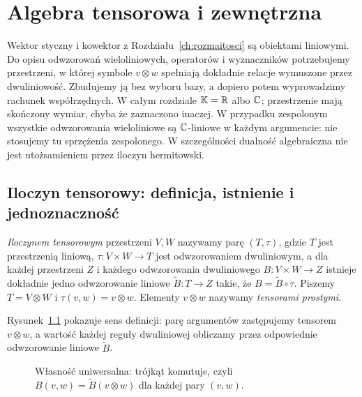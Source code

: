\chapter{Algebra tensorowa i zewnętrzna}
\label{ch:algebra-tensorowa}

Wektor styczny i kowektor z Rozdziału~\ref{ch:rozmaitosci} są obiektami
liniowymi. Do opisu odwzorowań wieloliniowych, operatorów i
wyznaczników potrzebujemy przestrzeni, w której symbole
$v\otimes w$ spełniają dokładnie relacje wymuszone przez dwuliniowość.
Zbudujemy ją bez wyboru bazy, a dopiero potem wyprowadzimy rachunek
współrzędnych. W całym rozdziale $\mathbb K=\mathbb{R}$ albo $\mathbb{C}$;
przestrzenie mają skończony wymiar, chyba że zaznaczono inaczej.
W przypadku zespolonym wszystkie odwzorowania wieloliniowe są
$\mathbb{C}$-liniowe w każdym argumencie: nie stosujemy tu sprzężenia
zespolonego. W szczególności dualność algebraiczna nie jest
utożsamieniem przez iloczyn hermitowski.

\section{Iloczyn tensorowy: definicja, istnienie i jednoznaczność}
\label{sec:iloczyn-tensorowy}

\begin{definicja}
\label{def:tensor-universal}
\emph{Iloczynem tensorowym} przestrzeni $V,W$ nazywamy parę
$(T,\tau)$, gdzie $T$ jest przestrzenią liniową,
$\tau\colon V\times W\to T$ jest odwzorowaniem dwuliniowym,
a dla każdej przestrzeni $Z$ i każdego odwzorowania dwuliniowego
$B\colon V\times W\to Z$ istnieje dokładnie jedno odwzorowanie
liniowe $\widetilde B\colon T\to Z$ takie, że
$B=\widetilde B\circ\tau$. Piszemy $T=V\otimes W$ i
$\tau(v,w)=v\otimes w$. Elementy $v\otimes w$ nazywamy
\emph{tensorami prostymi}.
\end{definicja}

Rysunek~\ref{fig:tensor-wlasnosc-uniwersalna} pokazuje sens definicji:
parę argumentów zastępujemy tensorem $v\otimes w$, a wartość
każdej reguły dwuliniowej obliczamy przez odpowiednie
odwzorowanie liniowe $\widetilde B$.
\begin{figure}[H]
\centering
{}
\caption{Własność uniwersalna: trójkąt komutuje, czyli
$B(v,w)=\widetilde B(v\otimes w)$ dla każdej pary $(v,w)$.}
\label{fig:tensor-wlasnosc-uniwersalna}
\end{figure}

